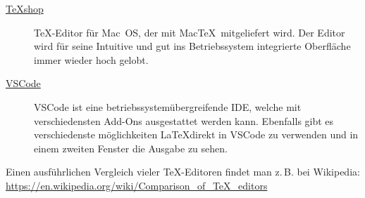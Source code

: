 \documentclass[
	vorläufig=false, 
	datum=2021-10-20,
	titel=Installationshinweise,
]{../tex/latexkurs-exercise}
\begin{document}
\begin{description}
\item[\href{http://pages.uoregon.edu/koch/texshop}{\TeX shop}]
\TeX-Editor für Mac~OS, der mit Mac\TeX\ mitgeliefert wird. Der Editor wird für seine Intuitive und gut ins Betriebssystem integrierte Oberfläche immer wieder hoch gelobt.

\item[\href{https://marketplace.visualstudio.com/items?itemName=James-Yu.latex-workshop}{VSCode}]
VSCode ist eine betriebssystemübergreifende IDE, welche mit verschiedensten Add-Ons ausgestattet werden kann. Ebenfalls gibt es verschiedenste möglichkeiten \LaTeX direkt in VSCode zu verwenden und in einem zweiten Fenster die Ausgabe zu sehen.
\end{description}

\noindent Einen ausführlichen Vergleich vieler \TeX-Editoren findet man z.\,B. bei Wikipedia:\\ \url{https://en.wikipedia.org/wiki/Comparison_of_TeX_editors}
\end{document}
